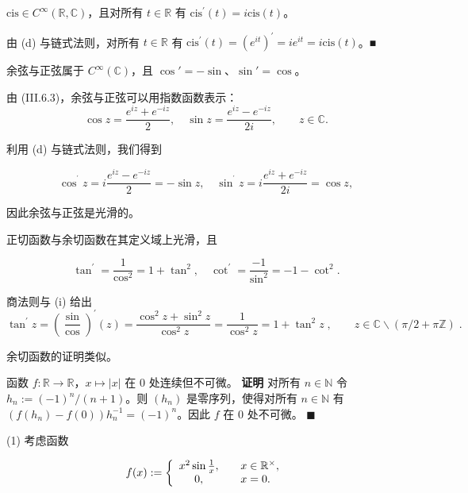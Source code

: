 \begin{example}
\begin{items}
$ \mathrm{cis} \in C^{\infty}(\mathbb{R}, \mathbb{C}) $，且对所有 $ t \in \mathbb{R} $ 有 $ \mathrm{cis}^{\prime}(t) = i \mathrm{cis}(t) $。

\proofhead
由 (d) 与链式法则，对所有 $ t \in \mathbb{R} $ 有 $ \mathrm{cis}^{\prime}(t) = (e^{it})^{\prime} = i e^{it} = i \mathrm{cis}(t) $。■
\item

余弦与正弦属于 $ C^\infty(\mathbb{C}) $，且 $ \cos' = -\sin $、$ \sin' = \cos $。

\proofhead
由 (III.6.3)，余弦与正弦可以用指数函数表示：
\[
\cos z=\frac{e^{iz}+e^{-iz}}{2},\quad\sin z=\frac{e^{iz}-e^{-iz}}{2i},\qquad z\in\mathbb{C}.
\]

利用 (d) 与链式法则，我们得到

\[
\cos^{^{\prime}}z=i\frac{e^{iz}-e^{-iz}}{2}=-\sin z,\quad\sin^{^{\prime}}z=i\frac{e^{iz}+e^{-iz}}{2i}=\cos z,
\]

因此余弦与正弦是光滑的。

\item

正切函数与余切函数在其定义域上光滑，且

\[
\tan^{\prime}=\frac{1}{\cos^{2}}=1+\tan^{2},\quad\cot^{\prime}=\frac{-1}{\sin^{2}}=-1-\cot^{2}.
\]

\proofhead
商法则与 (i) 给出
\[
\tan^{\prime}z=\left(\frac{\sin}{\cos}\right)^{\prime}(z)=\frac{\cos^{2}z+\sin^{2}z}{\cos^{2}z}=\frac{1}{\cos^{2}z}=1+\tan^{2}z\;,\qquad z\in\mathbb{C}\backslash\left(\pi/2+\pi\mathbb{Z}\right)\;.
\]

余切函数的证明类似。

\item

函数 $ f: \mathbb{R} \to \mathbb{R} $，$ x \mapsto |x| $ 在 0 处连续但不可微。
\textbf{证明} 对所有 $ n \in \mathbb{N} $ 令 $ h_n := (-1)^n / (n + 1) $。则 $ (h_n) $ 是零序列，使得对所有 $ n \in \mathbb{N} $ 有 $ (f(h_n) - f(0)) h_n^{-1} = (-1)^n $。因此 $ f $ 在 0 处不可微。 $ \blacksquare $

\end{items}

(1) 考虑函数

\begin{equation*}
f(x):=\left\{\begin{array}{c l}{x^{2}\sin\frac{1}{x},}&{\quad x\in\mathbb{R}^{\times},}\\ {0,}&{\quad x=0.}\end{array}\right.
\end{equation*}


\end{example}
